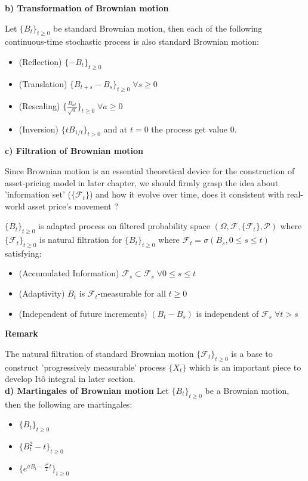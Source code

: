 \documentclass[12pt,a4paper,oneside]{book}
\begin{document}
	\textbf{b) Transformation of Brownian motion}
	
	Let $\{B_t\}_{t\geq 0}$ be standard Brownian motion, then each of the following continuous-time stochastic process is also standard Brownian motion: 
	
		\begin{itemize}[label=$\bullet$]
		\item (Reflection) $\{-B_t\}_{t\geq 0}$
		\item (Translation) $\{B_{t+s}-B_s\}_{t\geq 0}\; \forall s\geq 0$
 		\item (Rescaling) $\{\frac{B_{at}}{\sqrt{a}}\}_{t\geq 0}  \; \forall a\geq 0$
		\item (Inversion) $\{tB_{1/t}\}_{t>0}$ and at $t=0$ the process get value 0.	
		\end{itemize} 

	\textbf{c) Filtration of Brownian motion}
	
	Since Brownian motion is an essential theoretical device for the construction of asset-pricing model in later chapter, we should firmly grasp the idea about 'information set' ($\{\mathcal{F}_t\}$) 	and how it evolve over time, does it consistent with real-world asset price's movement ? 
	
	$\{B_t\}_{t\geq 0}$ is adapted process on filtered probability space $(\Omega, \mathcal{F}, \{\mathcal{F}_t\},\mathcal{P})$ where $\{\mathcal{F}_t\}_{t\geq 0}$ is natural filtration  for $\{B_t\}_{t\geq 0}$ where $\mathcal{F}_t= \sigma(B_s, 0\leq s\leq t)$  satisfying:
	
	\begin{itemize}[label=$\bullet$]
	\item (Accumulated Information) $\mathcal{F}_s \subset \mathcal{F}_s\; \forall  0\leq s\leq t $
	\item (Adaptivity) $B_t$ is $\mathcal{F}_t$-measurable for all $t\geq 0$
	\item (Independent of future increments) $(B_t-B_s)$ is independent of $\mathcal{F}_s \; \forall t>s$
\end{itemize} 

	\textbf{Remark}
	
	The natural filtration of standard Brownian motion $\{\mathcal{F}_t\}_{t\geq 0}$ is a base to construct 'progressively measurable' process $\{X_t\}$ which is an important piece to develop It\^{o} integral in later section.\\
	
	\textbf{d) Martingales of Brownian motion}
	Let $\{B_t\}_{t\geq 0}$ be a Brownian motion, then the following are martingales: 
	\begin{itemize}[label=$\bullet$]
		\item $\{B_t\}_{t\geq 0}$
		\item $\{B_t^2-t\}_{t\geq 0}$
		\item $\{e^{\sigma B_t- \frac{\sigma^2}{2}t}\}_{t\geq 0}$
	\end{itemize} 
	
\end{document}
